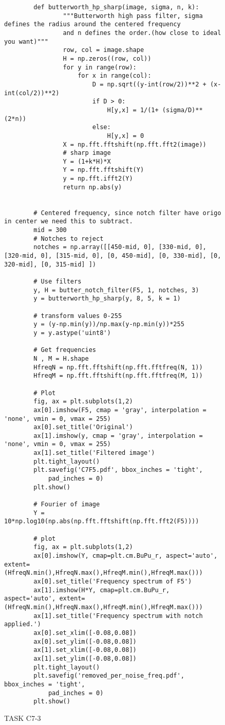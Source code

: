 {\begin{figure}[hbt!]
\begin{lstlisting}
        def butterworth_hp_sharp(image, sigma, n, k):
                """Butterworth high pass filter, sigma defines the radius around the centered frequency
                and n defines the order.(how close to ideal you want)"""
                row, col = image.shape
                H = np.zeros((row, col))
                for y in range(row):
                    for x in range(col):
                        D = np.sqrt((y-int(row/2))**2 + (x-int(col/2))**2)
                        if D > 0:
                            H[y,x] = 1/(1+ (sigma/D)**(2*n))
                        else:
                            H[y,x] = 0
                X = np.fft.fftshift(np.fft.fft2(image))
                # sharp image
                Y = (1+k*H)*X
                Y = np.fft.fftshift(Y)
                y = np.fft.ifft2(Y)
                return np.abs(y)
        
        
        # Centered frequency, since notch filter have origo in center we need this to subtract.
        mid = 300 
        # Notches to reject
        notches = np.array([[450-mid, 0], [330-mid, 0], [320-mid, 0], [315-mid, 0], [0, 450-mid], [0, 330-mid], [0, 320-mid], [0, 315-mid] ])
        
        # Use filters
        y, H = butter_notch_filter(F5, 1, notches, 3)
        y = butterworth_hp_sharp(y, 8, 5, k = 1)
        
        # transform values 0-255
        y = (y-np.min(y))/np.max(y-np.min(y))*255
        y = y.astype('uint8')
        
        # Get frequencies
        N , M = H.shape
        HfreqN = np.fft.fftshift(np.fft.fftfreq(N, 1))
        HfreqM = np.fft.fftshift(np.fft.fftfreq(M, 1))
        
        # Plot
        fig, ax = plt.subplots(1,2)
        ax[0].imshow(F5, cmap = 'gray', interpolation = 'none', vmin = 0, vmax = 255)
        ax[0].set_title('Original')
        ax[1].imshow(y, cmap = 'gray', interpolation = 'none', vmin = 0, vmax = 255)
        ax[1].set_title('Filtered image')
        plt.tight_layout()
        plt.savefig('C7F5.pdf', bbox_inches = 'tight',
            pad_inches = 0)
        plt.show()
        
        # Fourier of image
        Y = 10*np.log10(np.abs(np.fft.fftshift(np.fft.fft2(F5))))
        
        # plot
        fig, ax = plt.subplots(1,2)
        ax[0].imshow(Y, cmap=plt.cm.BuPu_r, aspect='auto', extent=(HfreqN.min(),HfreqN.max(),HfreqM.min(),HfreqM.max()))
        ax[0].set_title('Frequency spectrum of F5')
        ax[1].imshow(H*Y, cmap=plt.cm.BuPu_r, aspect='auto', extent=(HfreqN.min(),HfreqN.max(),HfreqM.min(),HfreqM.max()))
        ax[1].set_title('Frequency spectrum with notch applied.')
        ax[0].set_xlim([-0.08,0.08])
        ax[0].set_ylim([-0.08,0.08])
        ax[1].set_xlim([-0.08,0.08])
        ax[1].set_ylim([-0.08,0.08])
        plt.tight_layout()
        plt.savefig('removed_per_noise_freq.pdf', bbox_inches = 'tight',
            pad_inches = 0)
        plt.show()
    \end{lstlisting}
\caption{TASK C7-3}
\label{TASK C7-3}
\end{figure}



}

